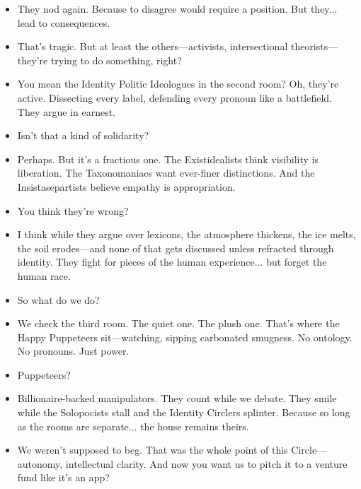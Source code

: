 \begin{itemize}[leftmargin=1.3cm]
\item[Eleanor:] They nod again. Because to disagree would require a position. But they... lead to consequences. 

\item[Nina:] That’s tragic. But at least the others—activists, intersectional theorists—they’re trying to do something, right?

\item[Eleanor:] You mean the Identity Politic Ideologues in the second room? Oh, they’re active. Dissecting every label, defending every pronoun like a battlefield. They argue in earnest.

\item[Nina:] Isn’t that a kind of solidarity?

\item[Eleanor:] Perhaps. But it’s a fractious one. The Existidealists think visibility is liberation. The Taxonomaniacs want ever-finer distinctions. And the Insistasepartists believe empathy is appropriation.

\item[Nina:] You think they’re wrong?

\item[Eleanor:] I think while they argue over lexicons, the atmosphere thickens, the ice melts, the soil erodes—and none of that gets discussed unless refracted through identity. They fight for pieces of the human experience... but forget the human race.

\item[Nina:] So what do we do?

\item[Eleanor:] We check the third room. The quiet one. The plush one. That’s where the Happy Puppeteers sit—watching, sipping carbonated smugness. No ontology. No pronouns. Just power.

\item[Nina:] Puppeteers?

\item[Eleanor:] Billionaire-backed manipulators. They count while we debate. They smile while the Solopocists stall and the Identity Circlers splinter. Because so long as the rooms are separate... the house remains theirs.

\item[Eleanor:] We weren’t supposed to beg. That was the whole point of this Circle—autonomy, intellectual clarity. And now you want us to pitch it to a venture fund like it’s an app?


\end{itemize}
